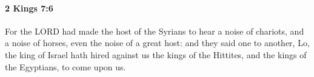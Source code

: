 
		\paragraph{2 Kings 7:6} %
			\label{2KINGS-7-6}

			For the LORD had made the host of the Syrians to hear a noise of chariots, and a noise of horses, even the noise of a great host: and they said one to another, Lo, the king of Israel hath hired against us the kings of the Hittites, and the kings of the Egyptians, to come upon us.


